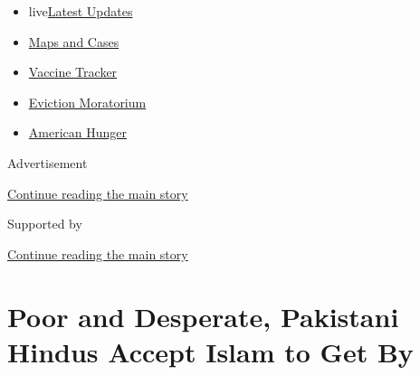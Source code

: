 \begin{itemize}
\tightlist
\item
  live\href{https://www.nytimes3xbfgragh.onion/2020/09/08/world/covid-19-coronavirus.html?name=styln-coronavirus-national\&region=TOP_BANNER\&block=storyline_menu_recirc\&action=click\&pgtype=Article\&impression_id=cfbfc661-f1e8-11ea-84e1-3d9340ced06b\&variant=undefined}{Latest
  Updates}
\item
  \href{https://www.nytimes3xbfgragh.onion/interactive/2020/us/coronavirus-us-cases.html?name=styln-coronavirus-national\&region=TOP_BANNER\&block=storyline_menu_recirc\&action=click\&pgtype=Article\&impression_id=cfbfed70-f1e8-11ea-84e1-3d9340ced06b\&variant=undefined}{Maps
  and Cases}
\item
  \href{https://www.nytimes3xbfgragh.onion/interactive/2020/science/coronavirus-vaccine-tracker.html?name=styln-coronavirus-national\&region=TOP_BANNER\&block=storyline_menu_recirc\&action=click\&pgtype=Article\&impression_id=cfbfed71-f1e8-11ea-84e1-3d9340ced06b\&variant=undefined}{Vaccine
  Tracker}
\item
  \href{https://www.nytimes3xbfgragh.onion/2020/09/02/your-money/eviction-moratorium-covid.html?name=styln-coronavirus-national\&region=TOP_BANNER\&block=storyline_menu_recirc\&action=click\&pgtype=Article\&impression_id=cfbfed72-f1e8-11ea-84e1-3d9340ced06b\&variant=undefined}{Eviction
  Moratorium}
\item
  \href{https://www.nytimes3xbfgragh.onion/interactive/2020/09/02/magazine/food-insecurity-hunger-us.html?name=styln-coronavirus-national\&region=TOP_BANNER\&block=storyline_menu_recirc\&action=click\&pgtype=Article\&impression_id=cfbfed73-f1e8-11ea-84e1-3d9340ced06b\&variant=undefined}{American
  Hunger}
\end{itemize}

Advertisement

\protect\hyperlink{after-top}{Continue reading the main story}

Supported by

\protect\hyperlink{after-sponsor}{Continue reading the main story}

\hypertarget{poor-and-desperate-pakistani-hindus-accept-islam-to-get-by}{%
\section{Poor and Desperate, Pakistani Hindus Accept Islam to Get
By}\label{poor-and-desperate-pakistani-hindus-accept-islam-to-get-by}}

